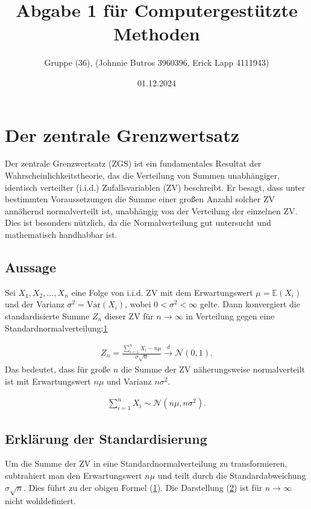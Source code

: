 \documentclass{article}
\title{Abgabe 1 für Computergestützte Methoden}
\author{Gruppe (36), (Johnnie Butros 3960396, Erick Lapp 4111943)}
\date{01.12.2024}
\begin{document}
\maketitle

\tableofcontents

\newpage

\section{Der zentrale Grenzwertsatz}

Der zentrale Grenzwertsatz (ZGS) ist ein fundamentales Resultat der Wahrscheinlichkeitstheorie, das die Verteilung von Summen unabhängiger, identisch verteilter (i.i.d.) Zufallsvariablen (ZV) beschreibt. Er besagt, dass unter bestimmten Voraussetzungen die Summe einer großen Anzahl solcher ZV annähernd
 normalverteilt ist, unabhängig von der Verteilung der einzelnen ZV. Dies ist besonders nützlich, da die Normalverteilung gut untersucht und mathematisch
 handhabbar ist.


\subsection{Aussage}
 
 Sei \( X_1, X_2, \dots, X_n \) eine Folge von i.i.d. ZV mit dem Erwartungswert \(\mu = \mathbb{E}(X_i)\) und der Varianz \(\sigma^2 = \mathrm{Var}(X_i)\), wobei \(0 < \sigma^2 < \infty\) gelte. Dann konvergiert die standardisierte Summe \(Z_n\) dieser ZV für \(n \to \infty\) in Verteilung gegen eine
 Standardnormalverteilung:\hyperref[sec:3]{1}

\begin{align}
Z_n = \frac{\sum_{i=1}^n X_i - n\mu}{\sigma \sqrt{n}} \xrightarrow{d} \mathcal{N}(0,1).      \label{sec:1}
\end{align}
Das bedeutet, dass für große \(n\) die Summe der ZV näherungsweise normalverteilt ist mit Erwartungswert \(n\mu\) und Varianz \(n\sigma^2\).

\begin{align}
\sum_{i=1}^n X_i \sim \mathcal{N}(n\mu, n\sigma^2).       \label{sec:2}
\end{align}


\subsection{Erklärung der Standardisierung}

Um die Summe der ZV in eine Standardnormalverteilung zu transformieren, subtrahiert man den Erwartungswert \(n\mu\) und teilt durch die Standardabweichung \(\sigma\sqrt{n}\). Dies führt zu der obigen Formel (\hyperref[sec:1]{1}). Die Darstellung (\hyperref[sec:2]{2}) ist für \(n \to \infty\) nicht wohldefiniert. 
\end{document}
